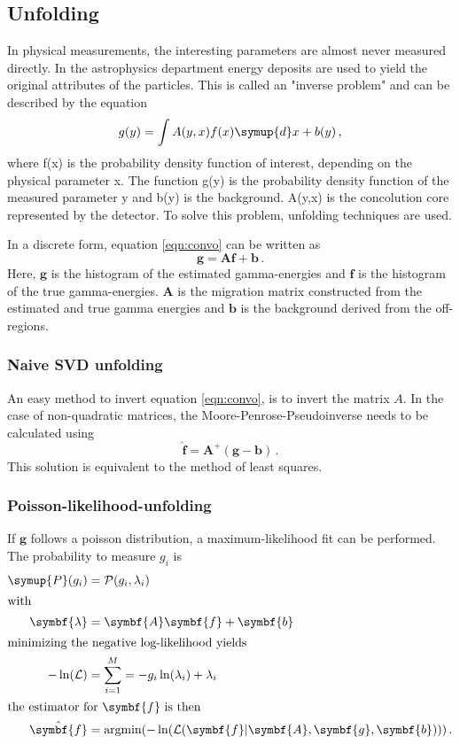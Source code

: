 \subsection{Unfolding}
In physical measurements, the interesting parameters are almost never measured directly.
In the astrophysics department energy deposits are used to yield the original attributes of the particles. This is called an "inverse problem" and can be described by
the equation
\begin{equation}
  g(y) = \int A(y,x) f(x) \symup{d}x + b(y) \, ,
  \label{eqn:convo}
\end{equation}
where f(x) is the probability density function of interest, depending on the physical parameter x.
The function g(y) is the probability density function of the measured parameter y and b(y) is the background. A(y,x) is the concolution core represented by the detector.
To solve this problem, unfolding techniques are used. \par
In a discrete form, equation \eqref{eqn:convo} can be written as
\begin{equation}
  \symbf{g} = \symbf{A}\symbf{f} + \symbf{b} \, .
\end{equation}
Here, $\symbf{g}$ is the histogram of the estimated gamma-energies and $\symbf{f}$ is the histogram of the true gamma-energies.
$\symbf{A}$ is the migration matrix constructed from the estimated and true gamma energies and $\symbf{b}$ is the background derived from the off-regions.

\subsubsection{Naive SVD unfolding}
An easy method to invert equation \eqref{eqn:convo}, is to invert the
matrix $A$. In the case of non-quadratic matrices, the
Moore-Penrose-Pseudoinverse needs to be calculated using
\begin{equation}
  \hat{\symbf{f}} = \symbf{A}^{+}(\symbf{g} - \symbf{b}) \, .
  \label{eqn:svd}
\end{equation}
This solution is equivalent to the method of least squares.

\subsubsection{Poisson-likelihood-unfolding}
If $\symbf{g}$ follows a poisson distribution, a maximum-likelihood fit can be performed.
The probability to measure $g_i$ is
\begin{align}
  \symup{P}(g_i) &= \mathcal{P}(g_i, \lambda_i) \\
  \shortintertext{with}
  \symbf{\lambda} &= \symbf{A}\symbf{f} + \symbf{b} \\
  \intertext{minimizing the negative log-likelihood yields}
  -\ln(\mathcal{L}) &= \sum_{i=1}^{M} = -g_i \ln(\lambda_i) + \lambda_i \\
  \intertext{the estimator for $\symbf{f}$ is then}
  \hat{\symbf{f}} &= \text{argmin}(-\ln(\mathcal{L}(\symbf{f}|\symbf{A},\symbf{g},\symbf{b})))\, .
\end{align}
